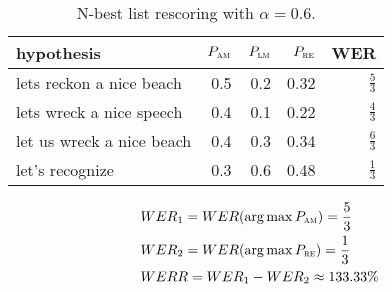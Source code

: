 \begin{table}[h!]
  \caption[N-best list rescoring]{N-best list rescoring with $\alpha=0.6$.}
  \label{table:nbest}
    \centering
    \begin{tabular*}{.6\linewidth}{@{\extracolsep{\fill}}lrrrr}
	    hypothesis & $P_{\textsc{am}}$ & $P_{\textsc{lm}}$ & $P_{\textsc{re}}$ & WER\\
	        \midrule
		lets reckon a nice beach    & 0.5 & 0.2 & 0.32 & $\frac{5}{3}$\\
		lets wreck a nice speech    & 0.4 & 0.1 & 0.22 & $\frac{4}{3}$\\
		let us wreck a nice beach   & 0.4 & 0.3 & 0.34 & $\frac{6}{3}$\\
		let's recognize             & 0.3 & 0.6 & 0.48 & $\frac{1}{3}$\\
    \end{tabular*}
\end{table}

	\begin{align*}
		\label{equation:WERR}
		&WER_{1}=WER(\operatorname*{arg\, max}{P_{\textsc{am}}})=\frac{5}{3} \nonumber\\
		&WER_{2}=WER(\operatorname*{arg\, max}{P_{\textsc{re}}})=\frac{1}{3} \nonumber\\
		&WERR =  WER_{1} - WER_{2}\approx133.33\%
	\end{align*}
